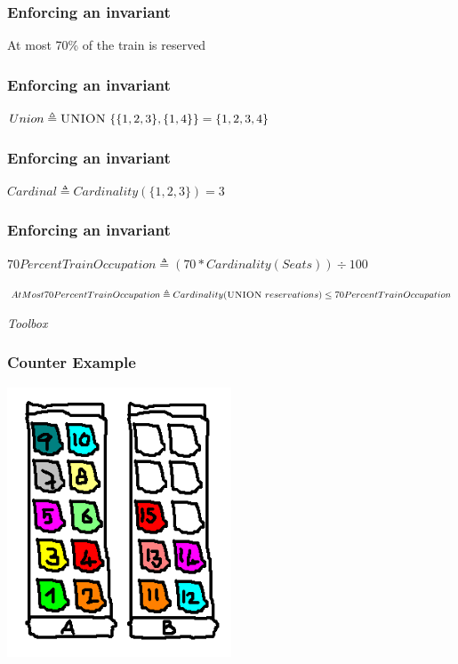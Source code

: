 \documentclass{beamer}
\begin{document}
\begin{frame}
  \frametitle{Enforcing an invariant}

  At most 70\% of the train is reserved
\end{frame}

\begin{frame}
  \frametitle{Enforcing an invariant}

  $Union \triangleq \textsc{UNION}\ \{\{1, 2, 3\}, \{1, 4\}\} = \{1, 2, 3, 4\}$
\end{frame}

\begin{frame}
  \frametitle{Enforcing an invariant}

  $Cardinal \triangleq Cardinality(\{1, 2, 3\}) = 3$
\end{frame}

\begin{frame}
  \frametitle{Enforcing an invariant}

  $70PercentTrainOccupation \triangleq (70 * Cardinality(Seats)) \div 100$
  
  $AtMost70PercentTrainOccupation \triangleq Cardinality(\textsc{UNION}\ reservations) \le 70PercentTrainOccupation$
\end{frame}

\begin{frame}
  \centering \Huge \emph{Toolbox}
\end{frame}

\begin{frame}
  \frametitle{Counter Example}
  
  \begin{center}
    \includegraphics[width=0.5\textwidth]{tla-introduction/over-70-train-single-seat}
  \end{center}
\end{frame}
\end{document}

